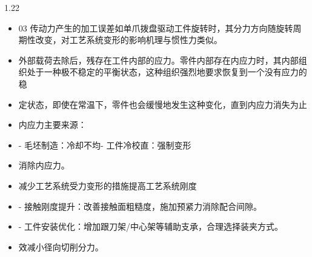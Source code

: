\documentclass[12pt,a4paper]{article}
\begin{document}
\begin{spacing}{1.22}
\begin{itemize}[leftmargin=2.2em,label=--]
  \item 03 传动力产生的加工误差如单爪拨盘驱动工件旋转时，其分力方向随旋转周期性改变，对工艺系统变形的影响机理与惯性力类似。
  \item 外部载荷去除后，残存在工件内部的应力。零件内部存在内应力时，其内部组织处于一种极不稳定的平衡状态，这种组织强烈地要求恢复到一个没有应力的稳
  \item 定状态，即使在常温下，零件也会缓慢地发生这种变化，直到内应力消失为止
  \item 内应力主要来源：
  \item - 毛坯制造：冷却不均- 工件冷校直：强制变形
  \item 消除内应力。
  \item 减少工艺系统受力变形的措施提高工艺系统刚度
  \item - 接触刚度提升：改善接触面粗糙度，施加预紧力消除配合间隙。
  \item - 工件安装优化：增加跟刀架/中心架等辅助支承，合理选择装夹方式。
  \item 效减小径向切削分力。
\end{itemize}


\end{spacing}
\end{document}
